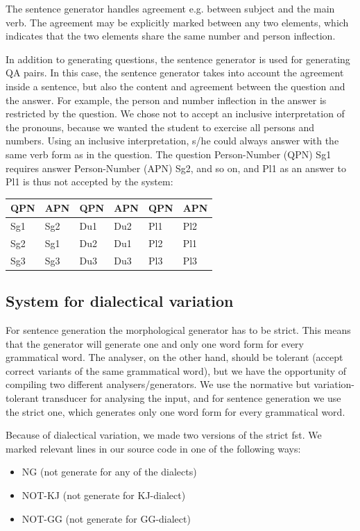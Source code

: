 \documentclass[11pt]{article}
\begin{document}
The sentence generator handles agreement e.g. between subject and the main verb. The agreement may be explicitly marked between any two elements, which indicates that the two elements share the same number and person inflection.

In addition to generating questions, the sentence generator is used for generating QA pairs. In this case, the sentence generator takes into account the agreement inside a sentence, but also the content and agreement between the question and the answer. For example, the person and number inflection in the answer is restricted by the question. We chose not to accept an inclusive interpretation of the pronouns, because we wanted the student to exercise all persons and numbers. Using an inclusive interpretation, s/he could always answer with the same verb form as in the question. The question Person-Number (QPN) Sg1 requires answer Person-Number (APN) Sg2, and so on, and Pl1 as an answer to Pl1 is thus not accepted by the system:\\

\begin{tabular}[t]{ll|ll|ll}
QPN &APN &QPN &APN &QPN &APN \\
\hline
Sg1 &Sg2 &Du1 &Du2 &Pl1 &Pl2 \\
Sg2 &Sg1 &Du2 &Du1 &Pl2 &Pl1 \\
Sg3 &Sg3 &Du3 &Du3 &Pl3 &Pl3 \\
\hline
\end{tabular}


\subsection{System for dialectical variation}\label{dialect}
For sentence generation the morphological generator has to be strict. This means that the generator will generate one and only one word form for every grammatical word. The analyser, on the other hand, should be tolerant (accept correct variants of the same grammatical word), but we have the opportunity of compiling two different analysers/generators. We use the normative but variation-tolerant transducer for analysing the input, and for sentence generation we use the strict one, which generates only one word form for every grammatical word.

Because of dialectical variation, we made two versions of the strict fst. We marked relevant lines in our source code in one of the following ways:
\begin {itemize}
\item NG (not generate for any of the dialects)
\item NOT-KJ (not generate for KJ-dialect) 
\item NOT-GG (not generate for GG-dialect)  
\end {itemize}
\end{document}
